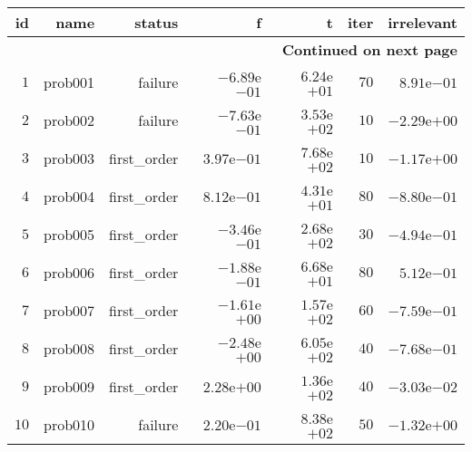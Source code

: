 \documentclass[varwidth=20cm,crop=true]{standalone}
\begin{document}
\begin{longtable}{rrrrrrr}
\hline
id & name & status & f & t & iter & irrelevant \\\hline
\endhead
\hline
\multicolumn{7}{r}{{\bfseries Continued on next page}}\\
\hline
\endfoot
\endlastfoot
\(     1\) & prob001 & failure & \(-6.89\)e\(-01\) & \( 6.24\)e\(+01\) & \(    70\) & \( 8.91\)e\(-01\) \\
\(     2\) & prob002 & failure & \(-7.63\)e\(-01\) & \( 3.53\)e\(+02\) & \(    10\) & \(-2.29\)e\(+00\) \\
\(     3\) & prob003 & first\_order & \( 3.97\)e\(-01\) & \( 7.68\)e\(+02\) & \(    10\) & \(-1.17\)e\(+00\) \\
\(     4\) & prob004 & first\_order & \( 8.12\)e\(-01\) & \( 4.31\)e\(+01\) & \(    80\) & \(-8.80\)e\(-01\) \\
\(     5\) & prob005 & first\_order & \(-3.46\)e\(-01\) & \( 2.68\)e\(+02\) & \(    30\) & \(-4.94\)e\(-01\) \\
\(     6\) & prob006 & first\_order & \(-1.88\)e\(-01\) & \( 6.68\)e\(+01\) & \(    80\) & \( 5.12\)e\(-01\) \\
\(     7\) & prob007 & first\_order & \(-1.61\)e\(+00\) & \( 1.57\)e\(+02\) & \(    60\) & \(-7.59\)e\(-01\) \\
\(     8\) & prob008 & first\_order & \(-2.48\)e\(+00\) & \( 6.05\)e\(+02\) & \(    40\) & \(-7.68\)e\(-01\) \\
\(     9\) & prob009 & first\_order & \( 2.28\)e\(+00\) & \( 1.36\)e\(+02\) & \(    40\) & \(-3.03\)e\(-02\) \\
\(    10\) & prob010 & failure & \( 2.20\)e\(-01\) & \( 8.38\)e\(+02\) & \(    50\) & \(-1.32\)e\(+00\) \\\hline
\end{longtable}
\end{document}
